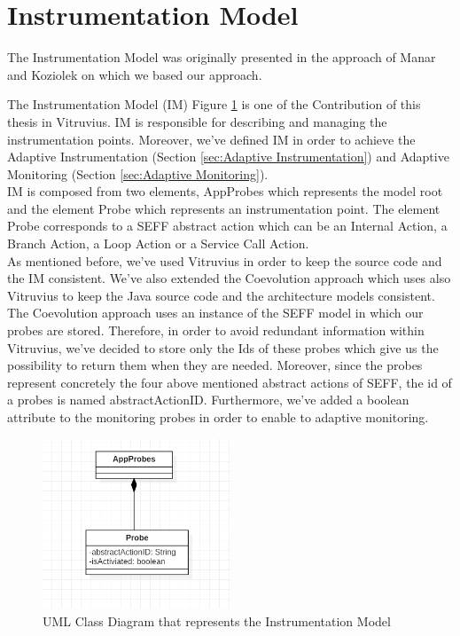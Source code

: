 \section{Instrumentation Model}
\label{sec:Instrumentation Model}
The Instrumentation Model was originally presented in the approach of Manar and Koziolek \cite{mazkatli2018continuous} on which we based our approach. 

The Instrumentation Model (IM) Figure \ref{fig:im} is one of the Contribution of this thesis in Vitruvius. IM is responsible for describing and managing the instrumentation points. Moreover, we've defined IM in order to achieve the Adaptive Instrumentation (Section \ref{sec:Adaptive Instrumentation}) and Adaptive Monitoring (Section \ref{sec:Adaptive Monitoring}).\\

IM is composed from two elements, AppProbes which represents the model root and the element Probe which represents an instrumentation point. The element Probe corresponds to a SEFF abstract action which can be an Internal Action, a Branch Action, a Loop Action or a Service Call Action.\\

As mentioned before, we’ve used Vitruvius in order to keep the source code and the IM consistent. We've also extended the Coevolution approach which uses also Vitruvius to keep the Java source code and the architecture models consistent. The Coevolution approach uses an instance of the SEFF model in which our probes are stored. Therefore, in order to avoid redundant information within Vitruvius, we've decided to store only the Ids of these probes which give us the possibility to return them when they are needed. Moreover, since the probes represent concretely the four above mentioned abstract actions of SEFF, the id of a probes is named abstractActionID. Furthermore, we've added a boolean attribute to the monitoring probes in order to enable to adaptive monitoring. \\

\begin{figure}[h]
\centering
\includegraphics[width=0.5\textwidth]{figures/im}
\caption{UML Class Diagram that represents the Instrumentation Model}
\label{fig:im}
\end{figure}


